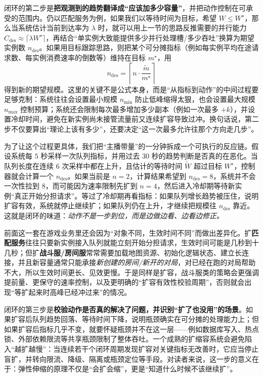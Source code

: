 闭环的第二步是\textbf{把观测到的趋势翻译成“应该加多少容量”}，并把动作控制在可承受的范围内。仍以匹配服务为例，如果我们以等待时间为目标，希望 $W\le W^\star$，那么当系统估计当前到达率为 $\lambda$ 时，就可以用上一节的思路反推需要的并行能力 $C_{\mathrm{des}}\approx \lceil \lambda W^\star\rceil$，再结合“单实例大致能提供多少并行处理槽/多少吞吐”换算为期望实例数 $n_{\mathrm{des}}$。如果用目标跟踪思路，则把某个可分摊指标（例如每实例平均在途请求数、每实例消费速率的倒数等）维持在目标 $m^\star$，用
\[
n_{\mathrm{des}}=\left\lceil n\cdot\frac{\tilde{m}}{m^\star}\right\rceil
\]
得到新的期望规模。这里的关键不是公式本身，而是“从指标到动作”的中间过程要足够克制：系统往往会设置最小规模 $n_{\min}$ 防止低峰缩得太狠，也会设置最大规模 $n_{\max}$ 控制预算；系统还会限制每次最多增加多少副本（例如一次最多 $+k$），并设置冷却时间，避免在新实例尚未接管流量前又连续扩容导致过冲。换句话说，第二步不仅要算出“理论上该有多少”，还要决定“这一次最多允许往那个方向走几步”。

为了让这个过程更具体，我们把“主播带量”的一分钟拆成一个可执行的反应链。假设系统每 $5$ 秒采样一次队列指标，并用过去 $30$ 秒的趋势判断是否真的在恶化。当队列长度在连续 $6$ 次采样中都在上升，且估计的等待时间 $\tilde{W}$ 超过目标 $W^\star$，控制器就会计算一个 $n_{\mathrm{des}}$。如果当前是 $n=2$，计算结果希望到 $n_{\mathrm{des}}=8$，系统并不会一次性拉到 8，而可能因为速率限制先扩到 $n=4$，然后进入冷却期等待新实例“真正开始分担请求”。等过了冷却期再看指标：如果队列增长趋势被压住，说明扩容有效，系统就停止继续扩；如果队列仍在上升，才继续把规模往 $n_{\mathrm{des}}$ 靠近。这就是闭环的味道：\emph{动作不是一步到位，而是边做边看、边看边修正。}

前面这一套在游戏业务里还会因为“对象不同，生效时间不同”而做出差异化。扩\textbf{匹配服务}往往只要新实例接入队列就能立刻开始分担请求，生效时间可能是几秒到十几秒；但扩\textbf{战斗服/房间服}常常需要加载地图资源、初始化逻辑状态、建立长连接，并且新容量通常只能承接\emph{新创建的房间/新开的对局}，对已经在跑的对局帮助不大，所以生效时间更长、见效更慢。于是同样是扩容，战斗服类的策略会更强调提前量、更保守的速率控制，以及更明确的“扩容有效性校验周期”，否则就会出现“等扩起来时高峰已经冲过来”的情况。

闭环的第三步是\textbf{校验动作是否真的解决了问题，并识别“扩了也没用”的场景}。如果扩容后队列趋势回落、等待时间下降，说明瓶颈确实在可分摊的处理能力上；但如果扩容后指标几乎不变，就要怀疑瓶颈并不在这一层——例如数据库写入、热点锁、外部依赖限流等共享瓶颈限制了整体吞吐。一个成熟的扩缩容系统会避免陷入“越扩越慢”：当连续若干个闭环周期发现扩容对关键指标无改善时，它应当停止盲扩，并转向限流、降级、隔离或瓶颈定位等手段。对读者来说，这一步的意义在于：弹性伸缩的原理不仅是“会扩会缩”，更是“知道什么时候不该继续扩”。

